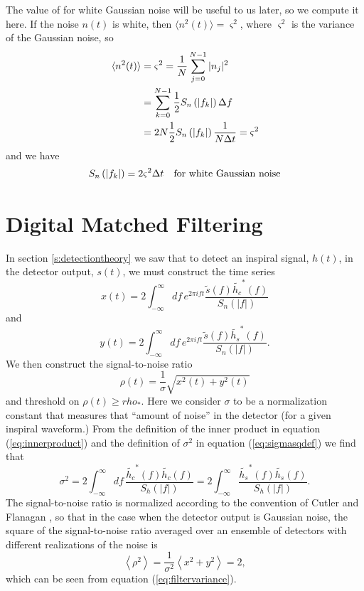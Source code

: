 The value of \ospsd for white Gaussian noise will be useful to us later, so we
compute it here. If the noise $n(t)$ is white, then $\langle n^2(t) \rangle =
\varsigma^2$, where $\varsigma^2$ is the variance of the Gaussian noise, so
\begin{equation}
\begin{split}
\langle n^2(t) \rangle &= \varsigma^2 = \frac{1}{N} \sum_{j=0}^{N-1} |n_j|^2 \\
&= \sum_{k=0}^{N-1} \frac{1}{2} S_n\left(\left|f_{k}\right|\right) \Delta f \\
&= 2N \frac{1}{2} S_n\left(\left|f_{k}\right|\right) \frac{1}{N\Delta t} = \varsigma^2
\end{split}
\end{equation}
and we have
\begin{equation}
S_n\left(\left|f_{k}\right|\right) = 2\varsigma^2\Delta t \quad\text{for white Gaussian noise}
\end{equation}

\section{Digital Matched Filtering}
\label{s:matchedfilter}

In section \ref{s:detectiontheory} we saw that to detect an inspiral signal,
$h(t)$, in the detector output, $s(t)$, we must construct the time series
\begin{equation}
\label{eq:xcts}
x(t) = 2 \int_{-\infty}^{\infty}df\,e^{2\pi i f t} 
\frac{\tilde{s}(f) \tilde{h_c}^\ast(f)}{S_n\left(\left|f\right|\right)}
\end{equation}
and
\begin{equation}
\label{eq:ycts}
y(t) = 2 \int_{-\infty}^{\infty}df\,e^{2\pi i f t} 
\frac{\tilde{s}(f) \tilde{h_s}^\ast(f)}{S_n\left(\left|f\right|\right)}.
\end{equation}
We then construct the signal-to-noise ratio
\begin{equation}
\rho(t) = \frac{1}{\sigma}\sqrt{x^2(t) + y^2(t)}
\label{eq:rhosqcts}
\end{equation}
and threshold on $\rho(t) \ge rho_\ast$. Here we consider $\sigma$ to be a
normalization constant that measures that ``amount of noise'' in the detector
(for a given inspiral waveform.) From the definition of the inner product in
equation (\ref{eq:innerproduct}) and the definition of $\sigma^2$ in equation
(\ref{eq:sigmasqdef}) we find that
\begin{equation}
\label{eq:sigmasqcts}
\sigma^2 = 2 \int_{-\infty}^{\infty}df\,
\frac{\tilde{h_c}^\ast(f)\tilde{h_c}(f)}{S_h\left(\left|f\right|\right)} 
= 2 \int_{-\infty}^\infty 
\frac{\tilde{h_s}^\ast(f)\tilde{h_s}(f)}{S_h\left(\left|f\right|\right)}.
\end{equation}
The signal-to-noise ratio is normalized according to the convention
of Cutler and Flanagan \cite{Cutler:1994}, so that in the case when the detector
output is Gaussian noise, the square of the signal-to-noise ratio averaged
over an ensemble of detectors with different realizations of the noise is
\begin{equation}
\left\langle \rho^2 \right\rangle = 
\frac{1}{\sigma^2} \left\langle x^2 + y^2 \right\rangle = 2,
\end{equation}
which can be seen from equation (\ref{eq:filtervariance}).

